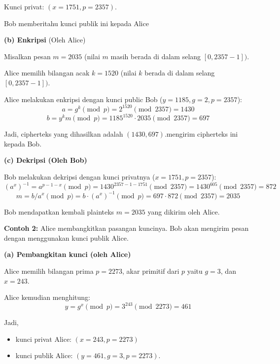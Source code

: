 \documentclass{article}
\begin{document}
\begin{enumerate}
Kunci privat: $(x = 1751, p = 2357)$.

Bob memberitahu kunci publik ini kepada Alice

\vspace{10mm}

\textbf{(b) Enkripsi} (Oleh Alice)

Misalkan pesan $m = 2035$ (nilai $m$ masih berada di dalam selang $[0, 2357 - 1])$.

Alice memilih bilangan acak $k = 1520$ (nilai $k$ berada di dalam selang $[0, 2357 - 1])$.

\newpage


Alice melakukan enkripsi dengan kunci public Bob ($y = 1185, g = 2, p = 2357$):
\[ a = g^k \pmod p = 2^{1520} \pmod{2357} = 1430 \]
\[ b = y^k m \pmod p = 1185^{1520} \cdot 2035 \pmod{2357} = 697 \]

Jadi, cipherteks yang dihasilkan adalah $(1430, 697)$.\nAlice mengirim cipherteks ini kepada Bob.

\textbf{(c) Dekripsi (Oleh Bob)}

Bob melakukan dekripsi dengan kunci privatnya ($x = 1751, p = 2357$):
\[ (a^x)^{-1} = a^{p-1-x} \pmod p = 1430^{2357-1-1751} \pmod{2357} = 1430^{605} \pmod{2357} = 872 \]
\[ m = b/a^x \pmod p = b \cdot (a^x)^{-1} \pmod p = 697 \cdot 872 \pmod{2357} = 2035 \]

Bob mendapatkan kembali plainteks $m = 2035$ yang dikirim oleh Alice.

\newpage


\textbf{Contoh 2:} Alice membangkitkan pasangan kuncinya. Bob akan mengirim pesan dengan menggunakan kunci publik Alice.

\textbf{(a) Pembangkitan kunci (oleh Alice)}

Alice memilih bilangan prima $p = 2273$, akar primitif dari $p$ yaitu $g = 3$, dan $x = 243$.

Alice kemudian menghitung:
\[ y = g^x \pmod{p} = 3^{243} \pmod{2273} = 461 \]

Jadi,

\begin{itemize}
    \item kunci privat Alice: $(x = 243, p = 2273)$
    \item kunci publik Alice: $(y = 461, g = 3, p = 2273)$.
\end{itemize}


\end{enumerate}
\end{document}

